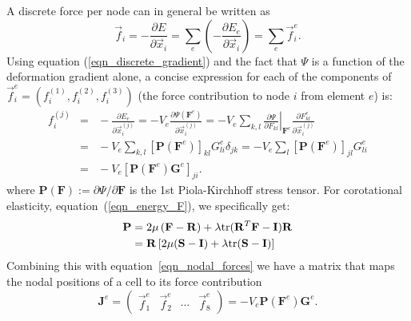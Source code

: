 A discrete force per node can in general be written as
\begin{equation}
\vec{f}_i=-\frac{\partial E}{\partial\vec{x}_i}=\sum_e\left(-\frac{\partial E_e}{\partial\vec{x}_i}\right)=\sum_e\vec{f}_i^e.
\label{eqn_elemental_forces}
\end{equation}
 Using equation (\ref{eqn_discrete_gradient}) and the fact that $\Psi$ is a function of the deformation gradient alone, a concise expression for each of the components
of $\vec{f}_i^e=(f_i^{(1)},f_i^{(2)},f_i^{(3)})$ (the force contribution to node $i$ from element $e$) is: 
\begin{eqnarray}
f_i^{(j)}\!\!\!&\!\!\!=\!\!\!&\!\!\!-\frac{\partial E_e}{\partial\vec{x}_i^{(j)}}=-V_e\frac{\partial\Psi(\mathbf{F}^e)}{\partial\vec{x}_i^{(j)}}
=
-V_e\sum_{k,l}\left.\frac{\partial\Psi}{\partial F_{kl}}\right|_{\mathbf{F}^e}\frac{\partial F_{kl}^e}{\partial\vec{x}_i^{(j)}} \nonumber \\
\!\!\!&\!\!\!=\!\!\!&\!\!\!
-V_e\sum_{k,l}[\mathbf{P}(\mathbf{F}^e)]_{kl}G_{li}^e\delta_{jk}
=
-V_e\sum_l[\mathbf{P}(\mathbf{F}^e)]_{jl}G_{li}^e \nonumber \\
\!\!\!&\!\!\!=\!\!\!&\!\!\!
-V_e[\mathbf{P}(\mathbf{F}^e)\mathbf{G}^e]_{ji}.
\label{eqn_nodal_forces}
\end{eqnarray}
where $\mathbf{P}(\mathbf{F})\!:=\!\partial\Psi/\partial\mathbf{F}$ is the 1st Piola-Kirchhoff stress tensor.
For corotational elasticity, equation~(\ref{eqn_energy_F}), we specifically get:
\begin{align}
\mathbf{P}&=2\mu\left(\mathbf{F}-\mathbf{R}\right) + \lambda \mbox{tr}(\mathbf{R}^T\mathbf{F}-\mathbf{I})\mathbf{R}\nonumber\\
        &=\mathbf{R}\left[2\mu(\mathbf{S}-\mathbf{I})+\lambda \mbox{tr}(\mathbf{S}-\mathbf{I})\right]\label{eqn_piola_stress}
\end{align}
Combining this with equation~\ref{eqn_nodal_forces} we have a matrix
that maps the nodal positions of a cell to its force contribution
\begin{equation}
\mathbf{J}^e
=
\left(
\begin{array}{cccc}
\vec{f}_1^e &
\vec{f}_2^e &
\cdots &
\vec{f}_8^e
\end{array}
\right)
=-V_e\mathbf{P}(\mathbf{F}^e)\mathbf{G}^e.
\label{eqn_cell_forces}
\end{equation}

